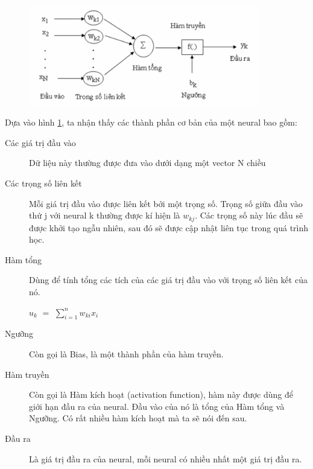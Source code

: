 \begin{figure}[H]
  \centering
  \includegraphics[width=0.9\textwidth]{images/chap2/norolnhantao.png}
  \label{chap2:neural_structure}    
\end{figure}
Dựa vào hình \ref{chap2:neural_structure}, ta nhận thấy các thành phần cơ bản của một neural bao gồm:
\begin{description}
    \item[Các giá trị đầu vào] Dữ liệu này thường được đưa vào dưới dạng một vector N chiều
    \item[Các trọng số liên kết] Mỗi giá trị đầu vào được liên kết bởi một trọng số. Trọng số giữa đầu vào thứ j với neural k thường được kí hiện là $\displaystyle w_{kj}$. Các trọng số này lúc đầu sẽ được khởi tạo ngẫu nhiên, sau đó sẽ được cập nhật liên tục trong quá trình học.
    \item[Hàm tổng] Dùng để tính tổng các tích của các giá trị đầu vào với trọng số liên kết của nó.\\
    \begin{center}
        $\displaystyle u_k$ $=$ $\displaystyle \sum_{i=1}^nw_{ki}x_i$
    \end{center}{}
    \item[Ngưỡng] Còn gọi là Bias, là một thành phần của hàm truyền.
    \item[Hàm truyền] Còn gọi là Hàm kích hoạt (activation function), hàm này được dùng để giới hạn đầu ra của neural. Đầu vào của nó là tổng của Hàm tổng và Ngưỡng. Có rất nhiều hàm kích hoạt mà ta sẽ nói đến sau.
     \item[Đầu ra] Là giá trị đầu ra của neural, mỗi neural có nhiều nhất một giá trị đầu ra.
    \begin{center}
    \end{center}
\end{description}

